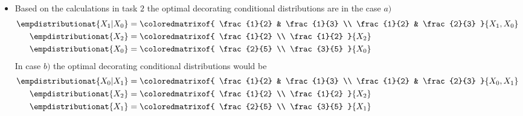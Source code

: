 \documentclass{scrartcl}
\begin{document}
{\begin{itemize}
{            }
            \item[(ii)] Based on the calculations in task $2$ the optimal decorating conditional distributions are in the case $a)$
            \begin{align*}
                \empdistributionat{\catvariableof{1}|\catvariableof{0}}
                &= \coloredmatrixof{
                    \frac{1}{2} & \frac{1}{3} \\
                    \frac{1}{2} & \frac{2}{3}
                }{\catvariableof{1},\catvariableof{0}} \\
                \empdistributionat{\catvariableof{2}}
                &= \coloredmatrixof{
                    \frac{1}{2}  \\
                    \frac{1}{2}
                }{\catvariableof{2}} \\
                \empdistributionat{\catvariableof{0}}
                &= \coloredmatrixof{
                    \frac{2}{5} \\
                    \frac{3}{5}
                }{\catvariableof{0}}
            \end{align*}
            In case $b)$ the optimal decorating conditional distributions would be
            \begin{align*}
                \empdistributionat{\catvariableof{0}|\catvariableof{1}}
                &= \coloredmatrixof{
                    \frac{1}{2} & \frac{1}{3} \\
                    \frac{1}{2} & \frac{2}{3}
                }{\catvariableof{0},\catvariableof{1}} \\
                \empdistributionat{\catvariableof{2}}
                &= \coloredmatrixof{
                    \frac{1}{2}  \\
                    \frac{1}{2}
                }{\catvariableof{2}} \\
                \empdistributionat{\catvariableof{1}}
                &= \coloredmatrixof{
                    \frac{2}{5} \\
                    \frac{3}{5}
                }{\catvariableof{1}}
            \end{align*}
        \end{itemize}
    }
\end{document}
